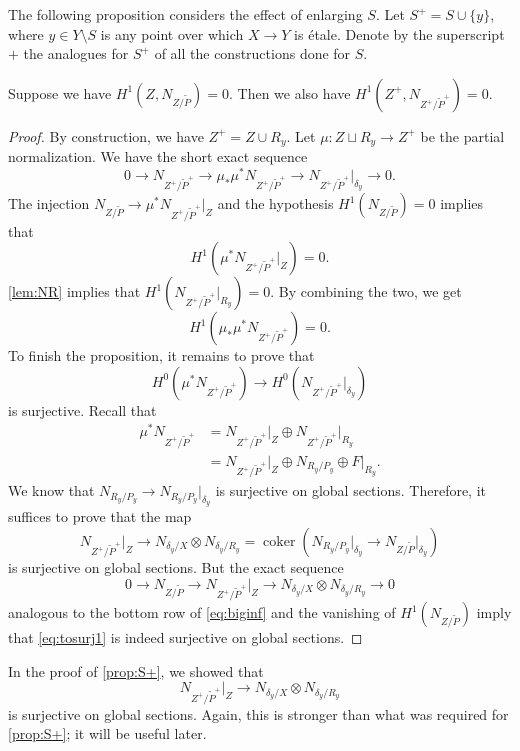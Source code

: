 \documentclass[11 pt]{amsart}
\providecommand {\from}{{\colon}}
\providecommand{\coker}{\operatorname{coker}}
\numberwithin{equation}{section}
\begin{document}
The following proposition considers the effect of enlarging $S$.
Let $S^+ = S \cup \{y \}$, where $y \in Y \setminus S$ is any point over which $X \to Y$ is \'etale.
Denote by the superscript $+$ the analogues for $S^+$ of all the constructions done for $S$.
\begin{proposition}\label{prop:S+}
  Suppose we have $H^1(Z, N_{Z/\widetilde{P}}) = 0$.
  Then we also have $H^1(Z^+, N_{Z^+/ \widetilde{P}^+}) = 0$.
\end{proposition}
\begin{proof}
  By construction, we have $Z^+ = Z \cup R_y$.
  Let $\mu \from Z \sqcup R_y \to Z^+$ be the partial normalization.
  We have the short exact sequence
  \[ 0 \to N_{Z^+/\widetilde{P}^+} \to \mu_*\mu^* N_{Z^+/\widetilde{P}^+} \to  N_{Z^+/\widetilde{P}^+} |_{\delta_y} \to 0.\]
  The injection $N_{Z/\widetilde{P}} \to \mu^*N_{Z^+/\widetilde{P}^+}|_Z$ and the hypothesis $H^1(N_{Z/\widetilde{P}}) = 0$ implies that
  \[H^1\left(\mu^*N_{Z^+/\widetilde{P}^+}\big|_Z\right) = 0.\]
  \autoref{lem:NR} implies that $H^1(N_{Z^+/\widetilde{P}^+}|_{R_y}) = 0$.
  By combining the two, we get 
  \[ H^1\left(\mu_*\mu^* N_{Z^+/\widetilde{P}^+}\right) = 0.\]
  To finish the proposition, it remains to prove that
  \[ H^0\left(\mu^* N_{Z^+/\widetilde{P}^+}\right) \to H^0\left(N_{Z^+/\widetilde{P}^+}\big|_{\delta_y}\right)\]
  is surjective.
  Recall that
  \begin{align*}
    \mu^* N_{Z^+/\widetilde{P}^+} &= N_{Z^+/\widetilde{P}^+} \big|_{Z} \oplus N_{Z^+/\widetilde{P}^+} \big|_{R_y} \\
    &= N_{Z^+/\widetilde{P}^+} \big|_{Z} \oplus N_{R_y/P_y} \oplus F\big|_{R_y}.
  \end{align*}
  We know that $N_{R_y/P_y} \to N_{R_y/P_y}|_{\delta_y}$ is surjective on global sections.
  Therefore, it suffices to prove that the map
  \begin{equation}\label{eq:tosurj1}
    N_{Z^+/\widetilde{P}^+} \big|_{Z} \to N_{\delta_y/X} \otimes N_{\delta_y/R_y} = \coker\left(N_{R_y/P_y}\big|_{\delta_y} \to N_{Z/\widetilde{P}}\big|_{\delta_y}\right)
  \end{equation}
  is surjective on global sections.
  But the exact sequence
  \[ 0 \to N_{Z/\widetilde{P}} \to N_{Z^+/\widetilde{P}^+} \big|_{Z} \to N_{\delta_y/X} \otimes N_{\delta_y/R_y} \to 0\]
  analogous to the bottom row of \eqref{eq:biginf} and the vanishing of $H^1(N_{Z/\widetilde{P}})$ imply that \eqref{eq:tosurj1} is indeed surjective on global sections.
\end{proof}
\begin{remark}\label{rem:surjhoriz}
  In the proof of \autoref{prop:S+}, we showed that
  \[ N_{Z^+/\widetilde{P}^+} \big|_{Z} \to N_{\delta_y/X} \otimes N_{\delta_y/R_y} \]
  is surjective on global sections.
  Again, this is stronger than what was required for \autoref{prop:S+}; it will be useful later.
\end{remark}
\end{document}
